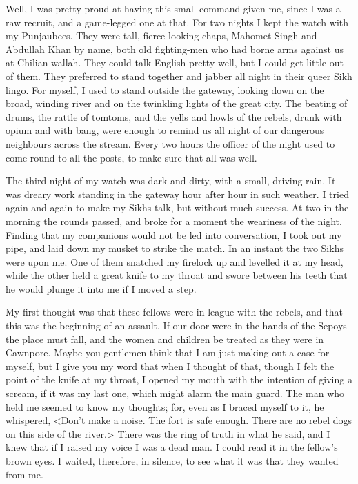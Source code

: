 Well, I was pretty proud at having this small command given me, since I was a raw recruit, and a game-legged one at that. For two nights I kept the watch with my Punjaubees. They were tall, fierce-looking chaps, Mahomet Singh and Abdullah Khan by name, both old fighting-men who had borne arms against us at Chilian-wallah. They could talk English pretty well, but I could get little out of them. They preferred to stand together and jabber all night in their queer Sikh lingo. For myself, I used to stand outside the gateway, looking down on the broad, winding river and on the twinkling lights of the great city. The beating of drums, the rattle of tomtoms, and the yells and howls of the rebels, drunk with opium and with bang, were enough to remind us all night of our dangerous neighbours across the stream. Every two hours the officer of the night used to come round to all the posts, to make sure that all was well.

The third night of my watch was dark and dirty, with a small, driving rain. It was dreary work standing in the gateway hour after hour in such weather. I tried again and again to make my Sikhs talk, but without much success. At two in the morning the rounds passed, and broke for a moment the weariness of the night. Finding that my companions would not be led into conversation, I took out my pipe, and laid down my musket to strike the match. In an instant the two Sikhs were upon me. One of them snatched my firelock up and levelled it at my head, while the other held a great knife to my throat and swore between his teeth that he would plunge it into me if I moved a step.

My first thought was that these fellows were in league with the rebels, and that this was the beginning of an assault. If our door were in the hands of the Sepoys the place must fall, and the women and children be treated as they were in Cawnpore. Maybe you gentlemen think that I am just making out a case for myself, but I give you my word that when I thought of that, though I felt the point of the knife at my throat, I opened my mouth with the intention of giving a scream, if it was my last one, which might alarm the main guard. The man who held me seemed to know my thoughts; for, even as I braced myself to it, he whispered, <Don't make a noise. The fort is safe enough. There are no rebel dogs on this side of the river.> There was the ring of truth in what he said, and I knew that if I raised my voice I was a dead man. I could read it in the fellow's brown eyes. I waited, therefore, in silence, to see what it was that they wanted from me.

